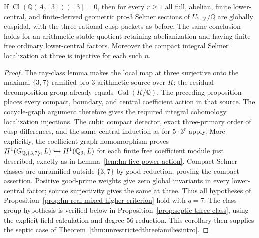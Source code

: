 \begin{corollary}
\label{cor:lm-septic-class-gate}
If $\operatorname{Cl}(\mathbb Q(A_7[3]))[3]=0$, then
for every $r\ge1$ all full, abelian, finite lower-central,
and finite-derived geometric pro-$3$ Selmer sections
of $U_{7\cdot3^r}/\mathbb Q$ are globally cuspidal,
with the three rational cusp packets as before.
The same conclusion holds for an arithmetic-stable
quotient retaining abelianization and having finite
free ordinary lower-central factors. Moreover the compact
integral Selmer localization at three is injective for each such $n$.
\end{corollary}
\begin{proof}
The ray-class lemma makes the local map at three
surjective onto the maximal $\{3,7\}$-ramified
pro-$3$ arithmetic source over $K$; the residual
decomposition group already equals
$\operatorname{Gal}(K/\mathbb Q)$.
The preceding proposition places every compact,
boundary, and central coefficient action in that
source.  The cocycle-graph argument therefore gives
the required integral cohomology localization
injections.  The cubic compact detector, exact
three-primary order of cusp differences, and the
same central induction as for $5\cdot3^r$ apply.
More explicitly, the coefficient-graph homomorphism proves
$H^1(G_{\mathbb Q,\{3,7\}},L)\hookrightarrow H^1(\mathbb Q_3,L)$
for each finite free coefficient module just described, exactly as
in Lemma~\ref{lem:lm-five-power-action}. Compact Selmer classes
are unramified outside $\{3,7\}$ by good reduction, proving
the compact assertion. Positive good-prime weights give zero
global invariants in every lower-central factor; source surjectivity
gives the same at three. Thus all hypotheses of
Proposition~\ref{prop:lm-real-mixed-higher-criterion} hold with $q=7$.
The class-group hypothesis is verified below in
Proposition~\ref{prop:septic-three-class}, using the explicit field
calculation and degree-$56$ reduction. This corollary then supplies
the septic case of Theorem~\ref{thm:unrestrictedthreefamiliesintro}.
\end{proof}
